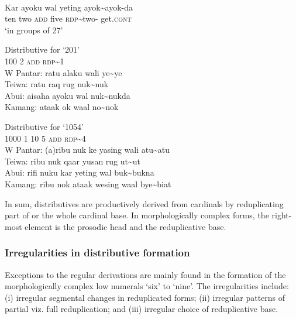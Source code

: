 \ea%
\label{bkm:Ref342661452}
\\
\gll Kar   ayoku   wal   yeting   ayok\~{}ayok-da\\  
   ten   two   \textsc{add}   five   \textsc{rdp}\textit{\~{}}two-\textsc{} get.\textsc{cont} \\
\glt  `in groups of 27' 
\z
 


\ea%
\label{bkm:Ref342656299}
 
 Distributive for `201' \\
\glllll  {} 100    2    \textsc{add}    \textsc{rdp}\~{}1\\  
 {W Pantar:} ratu    alaku    wali     ye\~{}ye        \\
 Teiwa:    ratu    raq    rug    nuk\~{}nuk      \\
 Abui:     aisaha     ayoku    wal    nuk\~{}nukda      \\
 Kamang:   ataak     ok     waal    no\~{}nok     \\  
\z


    

 
 
 
 

\ea%
\label{bkm:Ref342744393}
 
 Distributive for `1054'\\
\glllll   {}   1000    1  10  5    \textsc{add}  \textsc{rdp}\~{}4 \\      
   {W Pantar:}  (a)ribu   nuk   ke  yasing     wali  atu\~{}atu    \\
   Teiwa:    ribu     nuk  qaar  yusan    rug  ut\~{}ut    \\
   Abui:     rifi    nuku  kar  yeting    wal  buk\~{}bukna      \\
   Kamang:   ribu    nok  ataak  wesing    waal  bye\~{}biat     \\
\z


In sum, distributives are productively derived from cardinals by reduplicating part of or the whole cardinal base. In morphologically complex forms, the right-most element is the prosodic head and the reduplicative base. 

\subsubsection{Irregularities in distributive formation}
\label{sec:8:Irregulardistributive}
Exceptions to the regular derivations are mainly found in the formation of the morphologically complex low numerals `six' to `nine'. The irregularities include: (i) irregular segmental changes in reduplicated forms; (ii) irregular patterns of partial viz. full reduplication; and (iii) irregular choice of reduplicative base. 

